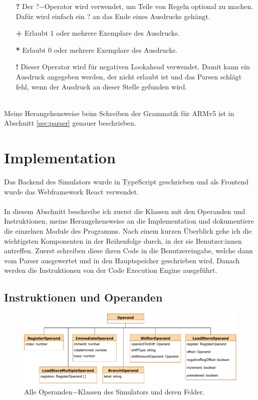 \documentclass[a4paper, 11pt, onecolumn]{article}
\begin{document}
\begin{itemize}[labelwidth=2em,leftmargin =\dimexpr{}+\relax, align=parleft]
\item[{\textbf{?}}] Der ?$-$Operator wird verwendet, um Teile von Regeln optional zu machen. Dafür wird einfach ein ? an das Ende eines Ausdrucks gehängt.
\item[{\textbf{+}}] Erlaubt 1 oder mehrere Exemplare des Ausdrucks.
\item[{\textbf{*}}] Erlaubt 0 oder mehrere Exemplare des Ausdrucks.
\item[{\textbf{!}}] Dieser Operator wird für negativen Lookahead verwendet. Damit kann ein Ausdruck angegeben werden, der nicht erlaubt ist und das Parsen schlägt fehl, wenn der Ausdruck an dieser Stelle gefunden wird.
\end{itemize}
~\\ \noindent
Meine Herangehensweise beim Schreiben der Grammatik für ARMv5 ist in Abschnitt \ref{sec:parser} genauer beschrieben.

\newpage
\section{Implementation}\label{sec:implementation}

Das Backend des Simulators wurde in TypeScript \cite{understandingtypescript, typescript} geschrieben und als Frontend wurde das Webframework React \cite{react} verwendet.\\ \\
In diesem Abschnitt beschreibe ich zuerst die Klassen mit den Operanden und Instruktionen, meine Herangehensweise an die Implementation und dokumentiere die einzelnen Module des Programms. Nach einem kurzen Überblick gehe ich die wichtigsten Komponenten in der Reihenfolge durch, in der sie Benutzer:innen antreffen. Zuerst schreiben diese ihren Code in die Benutzereingabe, welche dann vom Parser ausgewertet und in den Hauptspeicher geschrieben wird. Danach werden die Instruktionen von der Code Execution Engine ausgeführt.

\subsection{Instruktionen und Operanden}\label{sec:instAndOps}

\begin{figure}[!htb]
\centering
\includegraphics[width=1\textwidth]{data/operands}
\caption[Klassendiagramm der Operanden]{Alle Operanden$-$Klassen des Simulators und deren Felder.}
\label{fig:operands}
\end{figure}
\end{document}
